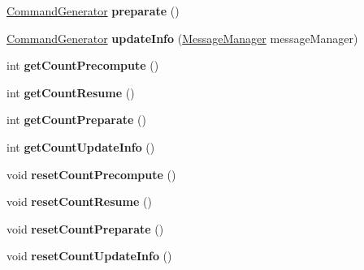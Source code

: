 \begin{DoxyCompactItemize}
\item 
\hypertarget{classadf_1_1component_1_1command_1_1CommandGenerator_aa2ab31b2efe2a69e1b0cdb89307ba2d5}{}\label{classadf_1_1component_1_1command_1_1CommandGenerator_aa2ab31b2efe2a69e1b0cdb89307ba2d5} 
\hyperlink{classadf_1_1component_1_1command_1_1CommandGenerator}{Command\+Generator} {\bfseries preparate} ()
\item 
\hypertarget{classadf_1_1component_1_1command_1_1CommandGenerator_a14b257fa2988e8e44d51bac2f6f3a5fc}{}\label{classadf_1_1component_1_1command_1_1CommandGenerator_a14b257fa2988e8e44d51bac2f6f3a5fc} 
\hyperlink{classadf_1_1component_1_1command_1_1CommandGenerator}{Command\+Generator} {\bfseries update\+Info} (\hyperlink{classadf_1_1agent_1_1communication_1_1MessageManager}{Message\+Manager} message\+Manager)
\item 
\hypertarget{classadf_1_1component_1_1command_1_1CommandGenerator_ae6e194bcec75cff40c427cc7ece619c3}{}\label{classadf_1_1component_1_1command_1_1CommandGenerator_ae6e194bcec75cff40c427cc7ece619c3} 
int {\bfseries get\+Count\+Precompute} ()
\item 
\hypertarget{classadf_1_1component_1_1command_1_1CommandGenerator_a77ec8cae118f0d7e7ffff6df3c842d8b}{}\label{classadf_1_1component_1_1command_1_1CommandGenerator_a77ec8cae118f0d7e7ffff6df3c842d8b} 
int {\bfseries get\+Count\+Resume} ()
\item 
\hypertarget{classadf_1_1component_1_1command_1_1CommandGenerator_a42075303fd034ffc65b444de8c7d3154}{}\label{classadf_1_1component_1_1command_1_1CommandGenerator_a42075303fd034ffc65b444de8c7d3154} 
int {\bfseries get\+Count\+Preparate} ()
\item 
\hypertarget{classadf_1_1component_1_1command_1_1CommandGenerator_a25e01c383e24f7ec09190bcaf1313dec}{}\label{classadf_1_1component_1_1command_1_1CommandGenerator_a25e01c383e24f7ec09190bcaf1313dec} 
int {\bfseries get\+Count\+Update\+Info} ()
\item 
\hypertarget{classadf_1_1component_1_1command_1_1CommandGenerator_a1fe8126306bfe9df5edb1947e4c0abae}{}\label{classadf_1_1component_1_1command_1_1CommandGenerator_a1fe8126306bfe9df5edb1947e4c0abae} 
void {\bfseries reset\+Count\+Precompute} ()
\item 
\hypertarget{classadf_1_1component_1_1command_1_1CommandGenerator_ac15d08b0d27a142d5ee86f9595ee37c2}{}\label{classadf_1_1component_1_1command_1_1CommandGenerator_ac15d08b0d27a142d5ee86f9595ee37c2} 
void {\bfseries reset\+Count\+Resume} ()
\item 
\hypertarget{classadf_1_1component_1_1command_1_1CommandGenerator_a4e90c7dc90e34174f8ad8da76bde85e9}{}\label{classadf_1_1component_1_1command_1_1CommandGenerator_a4e90c7dc90e34174f8ad8da76bde85e9} 
void {\bfseries reset\+Count\+Preparate} ()
\item 
\hypertarget{classadf_1_1component_1_1command_1_1CommandGenerator_a11042e27effecc3cc82e2af5e1df1b7a}{}\label{classadf_1_1component_1_1command_1_1CommandGenerator_a11042e27effecc3cc82e2af5e1df1b7a} 
void {\bfseries reset\+Count\+Update\+Info} ()
\end{DoxyCompactItemize}
